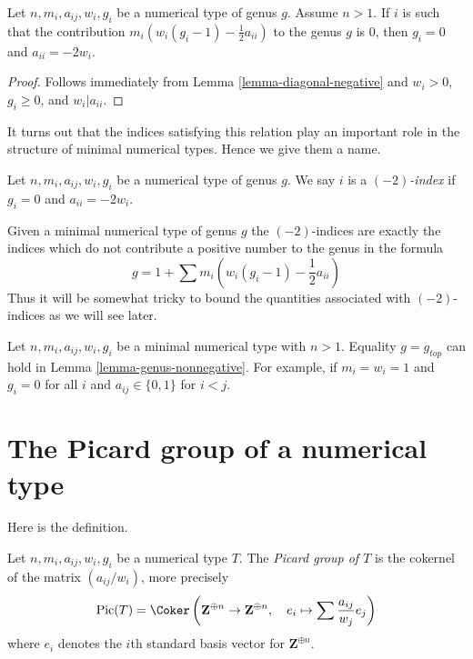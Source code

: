 \begin{lemma}
\label{lemma-minus-two}
Let $n, m_i, a_{ij}, w_i, g_i$ be a numerical type of genus $g$.
Assume $n > 1$. If $i$ is such that the contribution
$m_i(w_i(g_i - 1) - \frac{1}{2} a_{ii})$
to the genus $g$ is $0$, then $g_i = 0$ and $a_{ii} = -2w_i$.
\end{lemma}

\begin{proof}
Follows immediately from Lemma \ref{lemma-diagonal-negative} and
$w_i > 0$, $g_i \geq 0$, and $w_i | a_{ii}$.
\end{proof}

\noindent
It turns out that the indices satisfying this relation play an
important role in the structure of minimal numerical types.
Hence we give them a name.

\begin{definition}
\label{definition-type-minus-two}
Let $n, m_i, a_{ij}, w_i, g_i$ be a numerical type of genus $g$.
We say $i$ is a {\it $(-2)$-index} if $g_i = 0$ and $a_{ii} = -2w_i$.
\end{definition}

\noindent
Given a minimal numerical type of genus $g$ the $(-2)$-indices
are exactly the indices which do not contribute a positive number
to the genus in the formula
$$
g = 1 + \sum m_i(w_i(g_i - 1) - \frac{1}{2} a_{ii})
$$
Thus it will be somewhat tricky to bound the quantities associated
with $(-2)$-indices as we will see later.

\begin{remark}
\label{remark-genus-equality}
Let $n, m_i, a_{ij}, w_i, g_i$ be a minimal numerical type with $n > 1$.
Equality $g = g_{top}$ can hold in Lemma \ref{lemma-genus-nonnegative}.
For example, if $m_i = w_i = 1$ and $g_i = 0$ for all $i$ and
$a_{ij} \in \{0, 1\}$ for $i < j$.
\end{remark}


\section{The Picard group of a numerical type}
\label{section-picard-group}

\noindent
Here is the definition.

\begin{definition}
\label{definition-picard-group}
Let $n, m_i, a_{ij}, w_i, g_i$ be a numerical type $T$. The
{\it Picard group of $T$} is the cokernel of the matrix
$(a_{ij}/w_i)$, more precisely
$$
\text{Pic}(T) =
\Coker\left(
\mathbf{Z}^{\oplus n} \to \mathbf{Z}^{\oplus n},\quad
e_i
\mapsto
\sum \frac{a_{ij}}{w_j}e_j
\right)
$$
where $e_i$ denotes the $i$th standard basis vector for $\mathbf{Z}^{\oplus n}$.
\end{definition}

